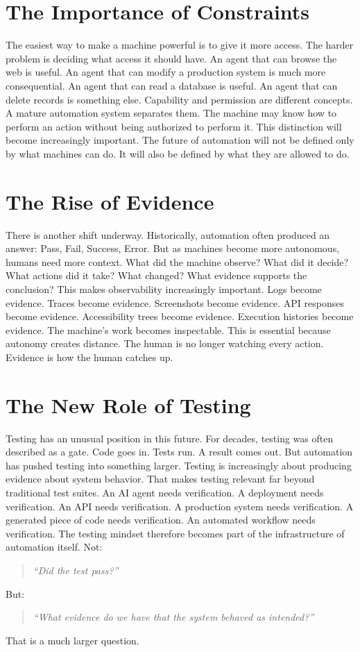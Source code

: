 \documentclass[11pt,twoside]{book}
\begin{document}
\section*{The Importance of Constraints}

The easiest way to make a machine powerful is to give it more access.
The harder problem is deciding what access it should have.
An agent that can browse the web is useful.
An agent that can modify a production system is much more consequential.
An agent that can read a database is useful.
An agent that can delete records is something else.
Capability and permission are different concepts.
A mature automation system separates them.
The machine may know how to perform an action without being authorized to perform it.
This distinction will become increasingly important.
The future of automation will not be defined only by what machines can do.
It will also be defined by what they are allowed to do.

\section*{The Rise of Evidence}

There is another shift underway.
Historically, automation often produced an answer: Pass, Fail, Success, Error.
But as machines become more autonomous, humans need more context.
What did the machine observe?
What did it decide?
What actions did it take?
What changed?
What evidence supports the conclusion?
This makes observability increasingly important.
Logs become evidence.
Traces become evidence.
Screenshots become evidence.
API responses become evidence.
Accessibility trees become evidence.
Execution histories become evidence.
The machine's work becomes inspectable.
This is essential because autonomy creates distance.
The human is no longer watching every action.
Evidence is how the human catches up.

\section*{The New Role of Testing}

Testing has an unusual position in this future.
For decades, testing was often described as a gate.
Code goes in.
Tests run.
A result comes out.
But automation has pushed testing into something larger.
Testing is increasingly about producing evidence about system behavior.
That makes testing relevant far beyond traditional test suites.
An AI agent needs verification.
A deployment needs verification.
An API needs verification.
A production system needs verification.
A generated piece of code needs verification.
An automated workflow needs verification.
The testing mindset therefore becomes part of the infrastructure of automation itself.
Not:
\begin{quote}
\emph{``Did the test pass?''}
\end{quote}
But:
\begin{quote}
\emph{``What evidence do we have that the system behaved as intended?''}
\end{quote}
That is a much larger question.
\end{document}
